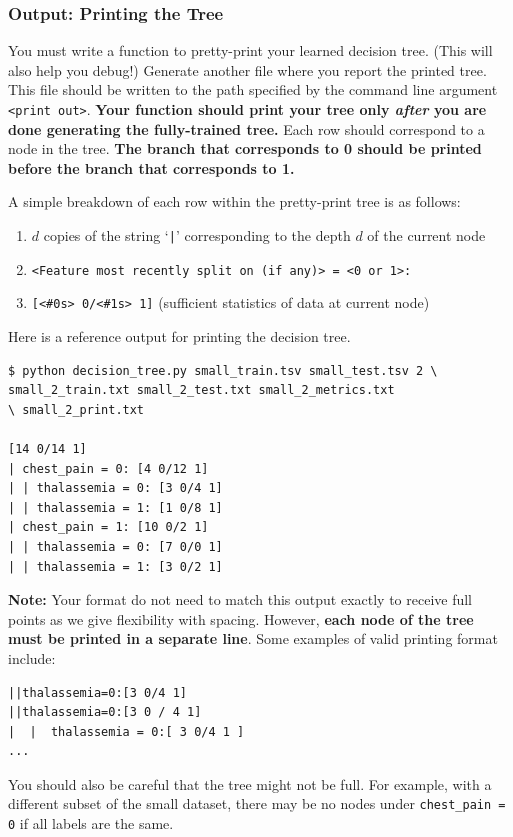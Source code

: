 \documentclass[11pt,addpoints,answers]{exam}
\begin{document}
\subsubsection{Output: Printing the Tree}
\label{sec:printtree}

You must write a function to pretty-print your learned decision tree. (This will also help you debug!) Generate another file where you report the printed tree. This file should be written to the path specified by the command line argument \lstinline{<print out>}. \textbf{Your function should print your tree only \emph{after} you are done generating the fully-trained tree.} Each row should correspond to a node in the tree. \textbf{The branch that corresponds to 0 should be printed before the branch that corresponds to 1.} 

A simple breakdown of each row within the pretty-print tree is as follows: 
\begin{enumerate}
    \item $d$ copies of the string `\texttt{|}' corresponding to the depth $d$ of the current node 
    \item \texttt{<Feature most recently split on (if any)> = <0 or 1>:}
    \item \texttt{[<\#0s> 0/<\#1s> 1]} (sufficient statistics of data at current node)
\end{enumerate}

Here is a reference output for printing the decision tree. 
\begin{lstlisting}[language=Shell]
$ python decision_tree.py small_train.tsv small_test.tsv 2 \ 
small_2_train.txt small_2_test.txt small_2_metrics.txt 
\ small_2_print.txt

[14 0/14 1]
| chest_pain = 0: [4 0/12 1]
| | thalassemia = 0: [3 0/4 1]
| | thalassemia = 1: [1 0/8 1]
| chest_pain = 1: [10 0/2 1]
| | thalassemia = 0: [7 0/0 1]
| | thalassemia = 1: [3 0/2 1]
\end{lstlisting}

\textbf{Note: }Your format do not need to match this output exactly to receive full points as we give flexibility with spacing. However, \textbf{each node of the tree must be printed in a separate line}.
Some examples of valid printing format include:
\begin{lstlisting}[language=Shell]
||thalassemia=0:[3 0/4 1]
||thalassemia=0:[3 0 / 4 1]
|  |  thalassemia = 0:[ 3 0/4 1 ]
...
\end{lstlisting}


You should also be careful that the tree might not be full. For example, with a different subset of the small dataset, there may be no nodes under \lstinline{chest_pain = 0} if all labels are the same.\\
\end{document}
